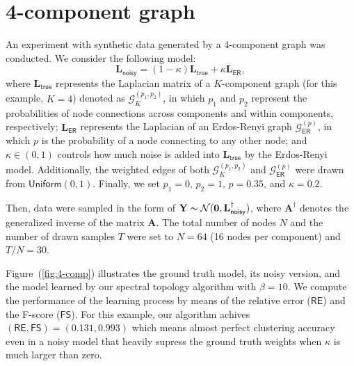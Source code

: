 \documentclass{article}
\begin{document}
\section{4-component graph}
An experiment with synthetic data generated by a 4-component graph was conducted.
We consider the following model:
\begin{equation}
  \mathbf{L}_{\mathsf{noisy}} = (1 - \kappa) \mathbf{L}_{\mathsf{true}} + \kappa \mathbf{L}_{\mathsf{ER}},
  \label{eq:model}
\end{equation}
where $\mathbf{L}_{\mathsf{true}}$ represents the Laplacian matrix of a $K$-component graph (for this example, $K = 4$)
denoted as $\mathcal{G}^{(p_1, p_2)}_K$,
in which $p_1$ and $p_2$ represent the probabilities of node connections across components and within components, respectively;
$\mathbf{L}_{\mathsf{ER}}$ represents the Laplacian of an Erdos-Renyi graph $\mathcal{G}^{(p)}_{\mathsf{ER}}$, in which $p$
is the probability of a node connecting to any other node; and $\kappa \in (0, 1)$ controls how much noise is added into
$\mathbf{L}_{\mathsf{true}}$ by the Erdos-Renyi model. Additionally, the weighted edges of both $\mathcal{G}^{(p_1, p_2)}_K$
and $\mathcal{G}^{(p)}_{\mathsf{ER}}$ were drawn from $\textsf{Uniform}(0, 1)$. Finally, we set $p_1 = 0$, $p_2 = 1$,
$p = 0.35$, and $\kappa = 0.2$.

Then, data were sampled in the form of $\mathbf{Y} \thicksim \mathcal{N}(\mathbf{0}, \mathbf{L}_{\mathsf{noisy}}^{\dagger})$,
where $\mathbf{A}^{\dagger}$ denotes the generalized inverse of the matrix $\mathbf{A}$. The total number of nodes $N$
and the number of drawn samples $T$ were set to $N = 64$ (16 nodes per component) and $T / N = 30$.

Figure~(\ref{fig:4-comp}) illustrates the ground truth model, its noisy version, and the model learned by our spectral
topology algorithm with $\beta = 10$. We compute the performance of the learning process by means of the relative error
($\textsf{RE}$) and the F-score ($\textsf{FS}$). For this example, our algorithm achives $(\mathsf{RE}, \mathsf{FS}) = (0.131, 0.993)$
which means almost perfect clustering accuracy even in a noisy model that heavily supress the ground truth weights when $\kappa$ is much
larger than zero.
\end{document}
